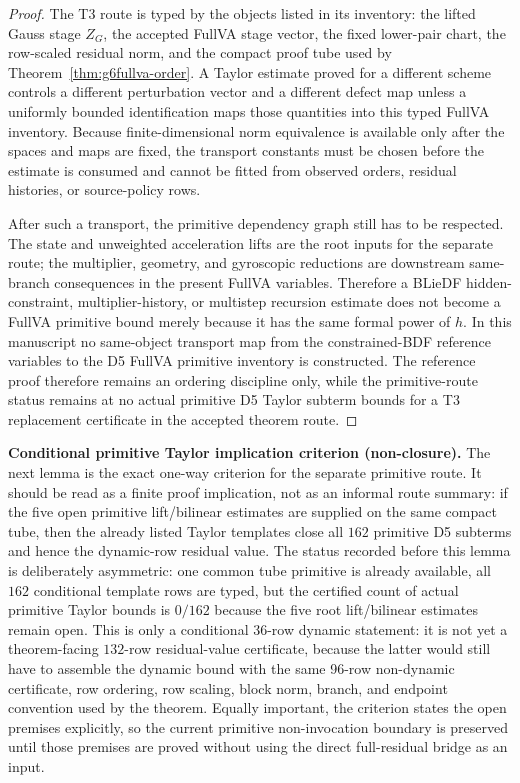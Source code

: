 \documentclass[preprint,12pt]{elsarticle}
\begin{document}
\begin{proof}
The T3 route is typed by the objects listed in its inventory: the lifted Gauss
stage \(Z_G\), the accepted FullVA stage vector, the fixed lower-pair chart,
the row-scaled residual norm, and the compact proof tube used by
Theorem~\ref{thm:g6fullva-order}.  A Taylor estimate proved for a different
scheme controls a different perturbation vector and a different defect map
unless a uniformly bounded identification maps those quantities into this
typed FullVA inventory.  Because finite-dimensional norm equivalence is
available only after the spaces and maps are fixed, the transport constants
must be chosen before the estimate is consumed and cannot be fitted from
observed orders, residual histories, or source-policy rows.

After such a transport, the primitive dependency graph still has to be
respected.  The state and unweighted acceleration lifts are the root inputs
for the separate route; the multiplier, geometry, and gyroscopic reductions
are downstream same-branch consequences in the present FullVA variables.
Therefore a BLieDF hidden-constraint, multiplier-history, or multistep
recursion estimate does not become a FullVA primitive bound merely because it
has the same formal power of \(h\).  In this manuscript no same-object
transport map from the constrained-BDF reference variables to the D5 FullVA
primitive inventory is constructed.  The reference proof therefore remains an
ordering discipline only, while the primitive-route status remains at
no actual primitive D5 Taylor subterm bounds for a T3 replacement certificate
in the accepted theorem route.
\end{proof}

\noindent\textbf{Conditional primitive Taylor implication criterion (non-closure).}
The next lemma is the exact one-way criterion for the separate primitive
route.  It should be read as a finite proof implication, not as an informal
route summary: if the five open primitive lift/bilinear estimates are supplied on the
same compact tube, then the already listed Taylor templates close all
\(162\) primitive D5 subterms and hence the dynamic-row residual value.
The status recorded before this lemma is deliberately asymmetric: one common
tube primitive is already available, all \(162\) conditional template rows are
typed, but the certified count of actual primitive Taylor bounds is \(0/162\)
because the
five root lift/bilinear estimates remain open.
This is only a conditional 36-row dynamic statement: it is not yet a
theorem-facing \(132\)-row residual-value certificate, because the latter
would still have to assemble the dynamic bound with the same 96-row
non-dynamic certificate, row ordering, row scaling, block norm, branch, and
endpoint convention used by the theorem.
Equally important, the criterion states the open premises explicitly, so
the current primitive non-invocation boundary is preserved until those
premises are proved without using the direct full-residual bridge as an input.
\end{document}

